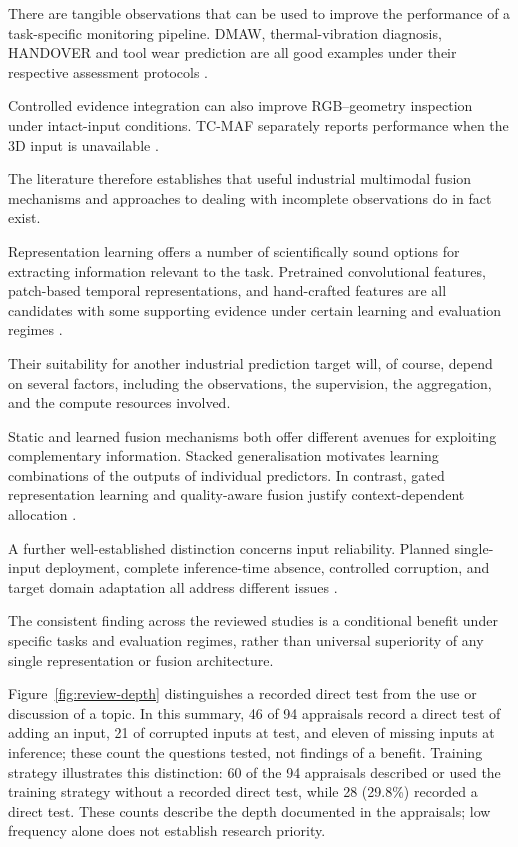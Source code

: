There are tangible observations that can be used to improve the performance of a task-specific
monitoring pipeline. DMAW, thermal-vibration diagnosis, HANDOVER and tool wear prediction are all
good examples under their respective assessment protocols
\parencite{P003,Huo2022Multisensor,Thoduka2024Handover,P045}.

Controlled evidence integration can also improve RGB--geometry inspection under intact-input
conditions. TC-MAF separately reports performance when the 3D input is unavailable \parencite{P026}.

The literature therefore establishes that useful industrial multimodal fusion mechanisms and
approaches to dealing with incomplete observations do in fact exist.

Representation learning offers a number of scientifically sound options for extracting information
relevant to the task. Pretrained convolutional features, patch-based temporal representations, and
hand-crafted features are all candidates with some supporting evidence under certain learning and
evaluation regimes \parencite{Roth2022Towards,Nie2023PatchTST,Horwitz2023Back}.

Their suitability for another industrial prediction target will, of course, depend on several
factors, including the observations, the supervision, the aggregation, and the compute resources
involved.

Static and learned fusion mechanisms both offer different avenues for exploiting complementary
information. Stacked generalisation motivates learning combinations of the outputs of individual
predictors. In contrast, gated representation learning and quality-aware fusion justify
context-dependent allocation \parencite{Ting1999Issues,P006,Zhang2023QMF}.

A further well-established distinction concerns input reliability. Planned single-input deployment,
complete inference-time absence, controlled corruption, and target domain adaptation all address
different issues \parencite{Li2025PGMTKD,Altinses2023Fuzzy,P051}.

The consistent finding across the reviewed studies is a conditional benefit under specific tasks and
evaluation regimes, rather than universal superiority of any single representation or fusion
architecture.

Figure~\ref{fig:review-depth} distinguishes a recorded direct test from the use or discussion of a
topic. In this summary, 46 of 94 appraisals record a direct test of adding an input, 21 of
corrupted inputs at test, and eleven of missing inputs at inference; these count the
questions tested, not findings of a benefit.
Training strategy illustrates this distinction: 60 of the 94 appraisals described or used the
training strategy without a recorded direct test, while 28 (29.8\%) recorded a direct test. These
counts describe the depth documented in the appraisals; low frequency alone does not establish
research priority.

